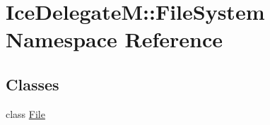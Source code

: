 \hypertarget{namespace_ice_delegate_m_1_1_file_system}{}\section{Ice\+Delegate\+M\+:\+:File\+System Namespace Reference}
\label{namespace_ice_delegate_m_1_1_file_system}
\subsection*{Classes}
\begin{DoxyCompactItemize}
\item 
class \hyperlink{class_ice_delegate_m_1_1_file_system_1_1_file}{File}
\end{DoxyCompactItemize}
